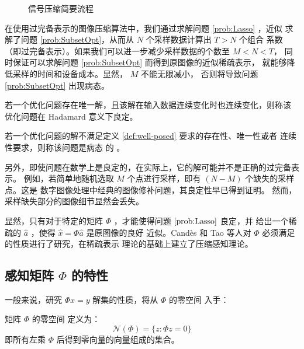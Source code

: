 \begin{figure}
\centering
{} %

\caption{信号压缩简要流程}
\label{Fig:Compress}
\end{figure}

在使用过完备表示的图像压缩算法中，我们通过求解问题 \ref{prob:Lasso} ，近似
求解了问题 \ref{prob:SubsetOpt}，从而从 $N$ 个采样数据计算出 $T > N$ 个组合
系数 （即过完备表示）。如果我们可以进一步减少采样数据的个数至 $M < N < T$，
同时保证可以求解问题 \ref{prob:SubsetOpt} 而得到原图像的近似稀疏表示，
就能够降低采样的时间和设备成本。显然， $M$ 不能无限减小，
否则将导致问题 \ref{prob:SubsetOpt} 出现病态。
\begin{definition}[良定问题] \label{def:well-posed}
若一个优化问题存在唯一解，且该解在输入数据连续变化时也连续变化，则称该
优化问题在 Hadamard 意义下良定。
\end{definition}
\begin{definition}[病态问题] \label{def:ill-posed}
若一个优化问题的解不满足定义 \ref{def:well-posed} 要求的存在性、唯一性或者
连续性要求，则称该问题是病态 的 \cite{MathProblemImage}。
\end{definition}

另外，即使问题在数学上是良定的，在实际上，它的解可能并不是正确的过完备表示。
例如，若简单地随机选取 $M$ 个点进行采样，即有 $(N-M)$ 个缺失的采样点。这是
数字图像处理中经典的图像修补问题，其良定性早已得到证明\cite{inpainting}。
 然而，采样缺失部分的图像细节显然会丢失。

显然，只有对于特定的矩阵 $\Phi$ ，才能使得问题 $\ref{prob:Lasso}$ 良定，并
给出一个稀疏的 $\hat{a}$ ，使得 $\hat{x} = \Phi \hat{a}$ 是原图像的良好
近似。Cand\`es 和 Tao 等人对 $\Phi$ 必须满足的性质进行了研究，在稀疏表示
理论的基础上建立了压缩感知理论。

\subsection{感知矩阵 $\Phi$ 的特性}

一般来说，研究 $\Phi x = y$ 解集的性质，将从 $\Phi$ 的零空间 入手：
\begin{definition}[零空间]
矩阵 $\Phi$ 的零空间 定义为：
\begin{equation}
\mathcal{N}(\Phi) = \{z:\Phi z = 0\}
\end{equation}
即所有左乘 $\Phi$ 后得到零向量的向量组成的集合。
\end{definition}

